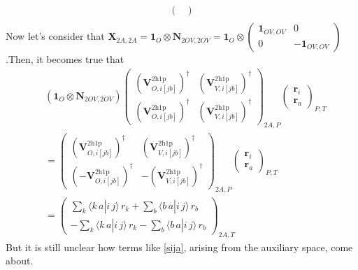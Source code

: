 \begin{align}
\begin{pmatrix}
\end{pmatrix} \\
\end{align}
Now let's consider that $\bm{X}_{2A,2A} = \bm{1}_O \otimes \bm{N}_{2OV,2OV} =\bm{1}_O \otimes \begin{pmatrix}
\bm{1}_{OV,OV} & 0 \\
0 & -\bm{1}_{OV,OV}
\end{pmatrix}
$.Then, it becomes true that
\begin{align}
&\left( \bm{1}_O \otimes \bm{N}_{2OV,2OV} \right) \begin{pmatrix}\left(\bm{V}^{2 \mathrm{h1p}}_{O,i[jb]}\right)^\dag & \left(\bm{V}^{2 \mathrm{h1p}}_{V,i[{jb}]}\right)^\dag \\ \left(\bm{V}^{2 \mathrm{h1p}}_{O,i[jb]}\right)^\dag & \left(\bm{V}^{2 \mathrm{h1p}}_{V,i[{jb}]}\right)^\dag\end{pmatrix}_{2A,P} \begin{pmatrix}
\bm{r}_i \\ \bm{r}_a
\end{pmatrix}_{P,T}\\
 &= \begin{pmatrix}\left(\bm{V}^{2 \mathrm{h1p}}_{O,i[jb]}\right)^\dag & \left(\bm{V}^{2 \mathrm{h1p}}_{V,i[{jb}]}\right)^\dag \\ \left(-\bm{V}^{2 \mathrm{h1p}}_{O,i[jb]}\right)^\dag & -\left(\bm{V}^{2 \mathrm{h1p}}_{V,i[{jb}]}\right)^\dag\end{pmatrix}_{2A,P} \begin{pmatrix}
\bm{r}_i \\ \bm{r}_a
\end{pmatrix}_{P,T} \\
&= \begin{pmatrix}
\sum_{k} \bigl\langle k\,a | i\,j \bigr\rangle\,r_k + \sum_{b} \bigl\langle b\,a | i\,j \bigr\rangle\,r_b \\
-\sum_{k} \bigl\langle k\,a | i\,j \bigr\rangle\,r_k - \sum_{b} \bigl\langle b\,a | i\,j \bigr\rangle\,r_b
\end{pmatrix}_{2A,T}
\end{align}
But it is still unclear how terms like \ref{sija}, arising from the auxiliary space, come about.

